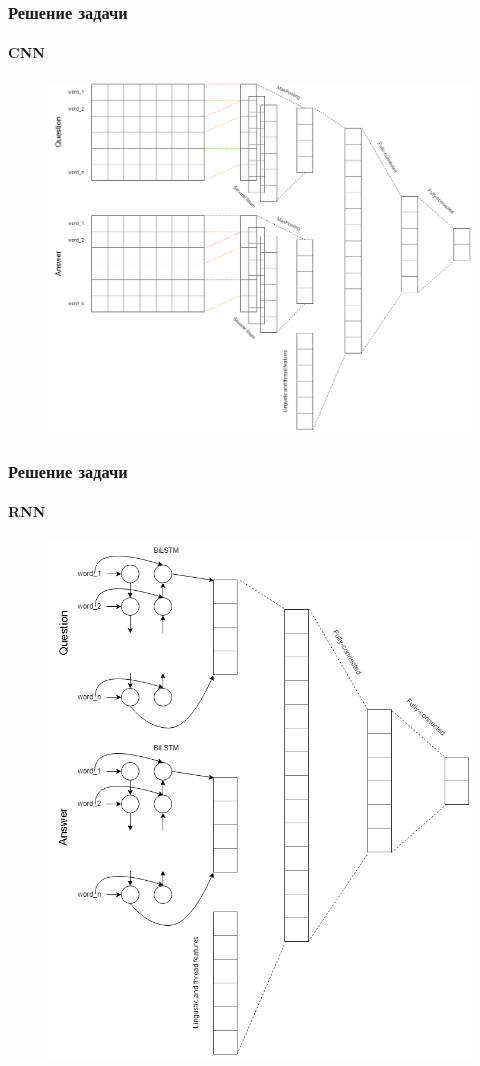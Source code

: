 \documentclass[10pt]{beamer}
\begin{document}

\begin{frame}
\frametitle{Решение задачи}
\framesubtitle{CNN}

\begin{figure}
	\centering
	\includegraphics[width=0.7\linewidth]{images/cnn.png}
\end{figure}

\end{frame}


\begin{frame}
\frametitle{Решение задачи}
\framesubtitle{RNN}

\begin{figure}
	\centering
	\includegraphics[width=0.5\linewidth]{images/rnn.png}
\end{figure}

\end{frame}
\end{document}
